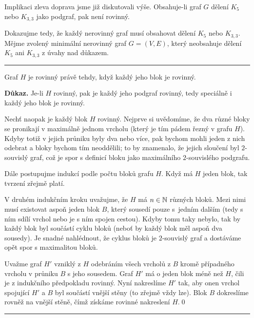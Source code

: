 \begin{enhproof}
 Implikaci zleva doprava jsme již diskutovali výše. Obsahuje-li graf $G$ dělení
 $K_5$ nebo $K_{3,3}$ jako podgraf, pak není rovinný.

 Dokazujme tedy, že každý nerovinný graf musí obsahovat dělení $K_5$ nebo
 $K_{3,3}$. Mějme zvolený minimální nerovinný graf $G = (V,E)$, který neobsahuje
 dělení $K_5$ ani $K_{3,3}$ z úvahy nad důkazem.\\

 \hrule

 \begin{auxilprop}
  \label{auxilprop:graf-rovinny-iff-bloky-rovinne}
  Graf $H$ je rovinný právě tehdy, když každý jeho blok je rovinný.
 \end{auxilprop}
 \textbf{\sffamily Důkaz.} Je-li $H$ rovinný, pak je každý jeho podgraf
 rovinný, tedy speciálně i každý jeho blok je rovinný.

 Nechť naopak je každý blok $H$ rovinný. Nejprve si uvědomíme, že dva různé
 bloky se pronikají v maximálně jednom vrcholu (který je tím pádem řezný v
 grafu $H$). Kdyby totiž v jejich průniku byly dva nebo více, pak bychom mohli
 jeden z nich odebrat a bloky bychom tím neoddělili; to by znamenalo, že jejich
 sloučení byl $2$-souvislý graf, což je spor s definicí bloku jako maximálního
 $2$-souvislého podgrafu.

 Dále postupujme indukcí podle počtu bloků grafu $H$. Když má $H$ jeden blok,
 tak tvrzení zřejmě platí.

 V druhém indukčním kroku uvažujme, že $H$ má $n \in \mathbb{N}$ různých bloků. Mezi
 nimi musí existovat aspoň jeden blok $B$, který sousedí pouze s~jedním dalším
 (tedy s ním sdílí vrchol nebo je s ním spojen cestou). Kdyby tomu taky nebylo,
 tak by každý blok byl součástí cyklu bloků (neboť by každý blok měl aspoň dva
 sousedy). Je snadné nahlédnout, že cyklus bloků je $2$-souvislý graf a
 dostáváme opět spor s maximalitou bloků.

 Uvažme graf $H'$ vzniklý z $H$ odebráním všech vrcholů z $B$ kromě případného
 vrcholu v průniku $B$ s jeho sousedem. Graf $H'$ má o jeden blok méně než $H$,
 čili je z indukčního předpokladu rovinný. Nyní nakreslíme $H'$ tak, aby onen
 vrchol spojující $H'$ a $B$ byl součástí vnější stěny (to zřejmě vždy lze).
 Blok $B$ dokreslíme rovněž na vnější stěně, čímž získáme rovinné nakreslení
 $H$.\hfill\qed\\

 \hrule


\end{enhproof}
